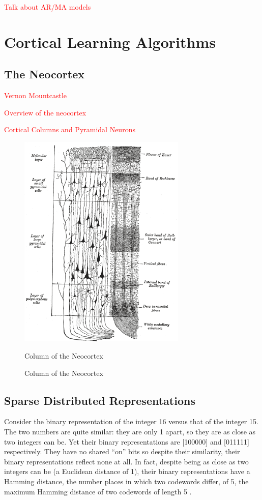 \documentclass[oneside,12pt,openany]{book}
\begin{document}
	\textcolor{red}{Talk about AR/MA models}
	
	\chapter{Cortical Learning Algorithms}
	
	\section{The Neocortex}
	
	\textcolor{red}{Vernon Mountcastle}
	
	\textcolor{red}{Overview of the neocortex}
	
	\textcolor{red}{Cortical Columns and Pyramidal Neurons}
	
	\begin{figure}[h!]
		\centering
		\includegraphics[width=8cm]{images/ColumnOfNeocortex.png}
		\caption{Column of the Neocortex}{Column of the Neocortex\footnotemark}
		\label{CorticalColumn}
	\end{figure}
	
	\section{Sparse Distributed Representations}
	
	Consider the binary representation of the integer 16 versus that of the integer 15. The two numbers are quite similar: they are only 1 apart, so they are as close as two integers can be. Yet their binary representations are [100000] and [011111] respectively. They have no shared ``on'' bits so despite their similarity, their binary representations reflect none at all. In fact, despite being as close as two integers can be (a Euclidean distance of 1), their binary representations have a Hamming distance, the number places in which two codewords differ, of 5, the maximum Hamming distance of two codewords of length 5 \cite{Adams}. 
	
\end{document}
